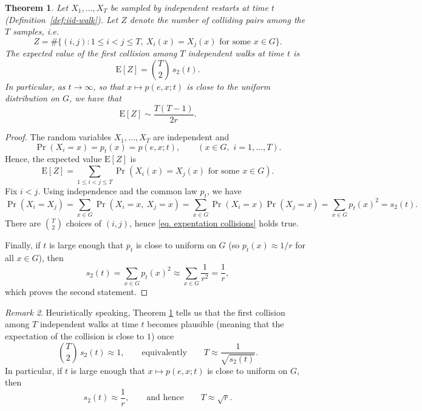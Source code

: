 \documentclass[11pt,reqno]{article}
\numberwithin{equation}{section}
\theoremstyle{plain}
\newtheorem{theorem}{Theorem}[section]
\theoremstyle{definition}
\theoremstyle{remark}
\newtheorem{remark}[theorem]{Remark}
\begin{document}
\begin{theorem}\label{thm:birthday-scale}
Let $X_1,\dots,X_T$ be sampled by independent restarts at time $t$
(Definition~\ref{def:iid-walk}). Let $Z$ denote the number of colliding pairs among the $T$ samples, i.e.
\[
Z=\#\{(i,j):1\le i<j\le T,\ X_i(x)=X_j(x)\text{  for some  } x\in G\}.
\]
The expected value of the first collision among $T$ independent walks
at time $t$ is
\[
\mathrm E[Z]=\binom{T}{2}\,s_2(t).
\]
In particular, as $t\to\infty$, so that $x\mapsto p(e,x;t)$ is close to the uniform distribution on $G$, we
have that
\begin{equation}\label{eq. expentation collisions}
\mathrm E[Z] \sim \frac{T(T-1)}{2r}.
\end{equation}
\end{theorem}
\begin{proof}
The random variables $X_1,\dots,X_T$ are independent and
\[
\Pr(X_i=x)=p_t(x)=p(e,x;t), \qquad (x\in G,\,\, i=1,\ldots,T).
\]
Hence, the expected value $\mathrm E[Z]$ is
\[
\mathrm E[Z]=\sum_{1\le i<j\le T}\Pr( X_i(x)=X_j(x)\text{  for some  } x\in G).
\]
Fix $i<j$. Using independence and the common law $p_t$, we have
\[
\Pr(X_i=X_j)
=\sum_{x\in G}\Pr(X_i=x,\ X_j=x)
=\sum_{x\in G}\Pr(X_i=x)\Pr(X_j=x)
=\sum_{x\in G}p_t(x)^2
=s_2(t).
\]
There are $\binom{T}{2}$ choices of $(i,j)$, hence \eqref{eq. expentation collisions} holds true.

Finally, if $t$ is large enough that $p_t$ is close to uniform on $G$ (so $p_t(x)\approx 1/r$ for
all $x\in G$), then
\[
s_2(t)=\sum_{x\in G}p_t(x)^2 \approx \sum_{x\in G}\frac{1}{r^2}=\frac{1}{r},
\]
which proves the second statement.
\end{proof}

\begin{remark}
Heuristically speaking, Theorem \ref{thm:birthday-scale} tells us that the first collision among $T$ independent walks at time $t$ becomes plausible (meaning that the expectation of the collision is close to $1$) once
\[
\binom{T}{2}\,s_2(t)\approx 1,
\qquad\text{equivalently}\qquad
T\approx \frac{1}{\sqrt{s_2(t)}}.
\]
In particular, if $t$ is large enough that $x\mapsto p(e,x;t)$ is close to uniform on $G$, then
\[
s_2(t)\approx \frac{1}{r},
\qquad\text{and hence}\qquad
T\approx \sqrt{r}.
\]


\end{remark}
\end{document}
